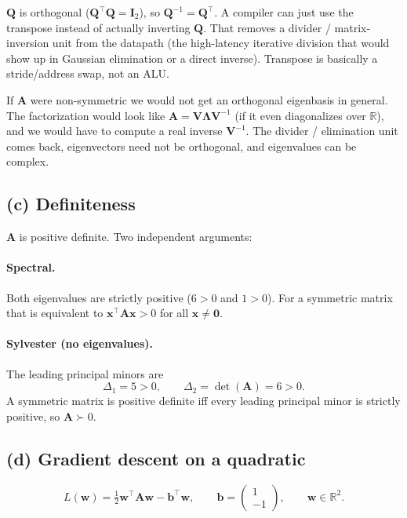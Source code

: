 \documentclass[11pt]{article}
\newcommand{\vct}[1]{\mathbf{#1}}
\newcommand{\mat}[1]{\mathbf{#1}}
\begin{document}
\(\mat{Q}\) is orthogonal (\(\mat{Q}^\top\mat{Q}=\mat{I}_2\)), so
\(\mat{Q}^{-1}=\mat{Q}^\top\). A compiler can just use the transpose instead
of actually inverting \(\mat{Q}\). That removes a divider / matrix-inversion
unit from the datapath (the high-latency iterative division that would show
up in Gaussian elimination or a direct inverse). Transpose is basically a
stride/address swap, not an ALU.

If \(\mat{A}\) were non-symmetric we would not get an orthogonal eigenbasis
in general. The factorization would look like
\(\mat{A}=\mat{V}\mat{\Lambda}\mat{V}^{-1}\) (if it even diagonalizes over
\(\mathbb{R}\)), and we would have to compute a real inverse
\(\mat{V}^{-1}\). The divider / elimination unit comes back, eigenvectors
need not be orthogonal, and eigenvalues can be complex.

\subsection*{(c) Definiteness}

\(\mat{A}\) is positive definite. Two independent arguments:

\paragraph{Spectral.}
Both eigenvalues are strictly positive (\(6>0\) and \(1>0\)). For a
symmetric matrix that is equivalent to \(\vct{x}^\top\mat{A}\vct{x}>0\) for
all \(\vct{x}\neq\vct{0}\).

\paragraph{Sylvester (no eigenvalues).}
The leading principal minors are
\[
\Delta_1 = 5 > 0,
\qquad
\Delta_2 = \det(\mat{A}) = 6 > 0.
\]
A symmetric matrix is positive definite iff every leading principal minor is
strictly positive, so \(\mat{A}\succ 0\).

\subsection*{(d) Gradient descent on a quadratic}

\[
L(\vct{w})
= \tfrac12 \vct{w}^\top \mat{A}\vct{w} - \vct{b}^\top\vct{w},
\qquad
\vct{b}
=
\begin{pmatrix} 1 \\ -1 \end{pmatrix},
\qquad
\vct{w}\in\mathbb{R}^2.
\]
\end{document}
